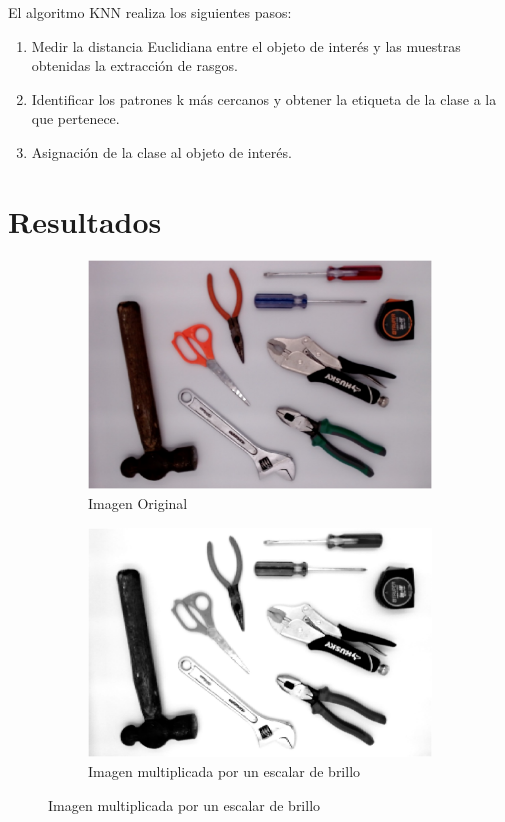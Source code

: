 \documentclass[a4paper, 11pt]{article}
\begin{document}
El algoritmo KNN realiza los siguientes pasos:

\begin{enumerate}
\item Medir la distancia Euclidiana entre el objeto de interés y las muestras obtenidas la extracción de rasgos.
\item Identificar los patrones k más cercanos y obtener la etiqueta de la clase a la que pertenece.
\item Asignación de la clase al objeto de interés.
\end{enumerate}

\newpage
\section{Resultados}

\begin{figure}[h]
  \centering
  \begin{subfigure}{0.5\linewidth}
    \includegraphics[width=\linewidth]{paso1} 
    \caption{Imagen Original}
    \label{fig:1a}
  \end{subfigure}\hfill
  \begin{subfigure}{0.5\linewidth}
    \includegraphics[width=\linewidth]{paso2}
    \caption{Imagen multiplicada por un escalar de brillo}
    \label{fig:1a}
  \end{subfigure}
  

\end{figure}
\end{document}

